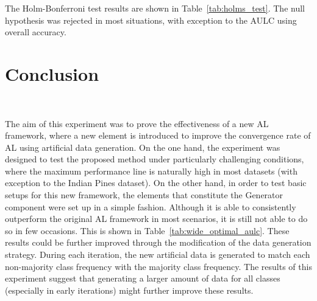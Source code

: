 \documentclass[parskip=full]{scrartcl}
\begin{document}

The Holm-Bonferroni test results are shown in Table~\ref{tab:holms_test}. The
null hypothesis was rejected in most situations, with exception to the AULC
using overall accuracy.


\section{Conclusion}~\label{sec:conclusion}

The aim of this experiment was to prove the effectiveness of a new AL framework,
where a new element is introduced to improve the convergence rate of AL using
artificial data generation. On the one hand, the experiment was designed to test
the proposed method under particularly challenging conditions, where the maximum
performance line is naturally high in most datasets (with exception to the
Indian Pines dataset). On the other hand, in order to test basic setups for this
new framework, the elements that constitute the Generator component were set up
in a simple fashion. Although it is able to consistently outperform the original
AL framework in most scenarios, it is still not able to do so in few occasions.
This is shown in Table~\ref{tab:wide_optimal_aulc}. These results could be
further improved through the modification of the data generation strategy.
During each iteration, the new artificial data is generated to match each
non-majority class frequency with the majority class frequency. The results of
this experiment suggest that generating a larger amount of data for all classes
(especially in early iterations) might further improve these results. 
\end{document}
